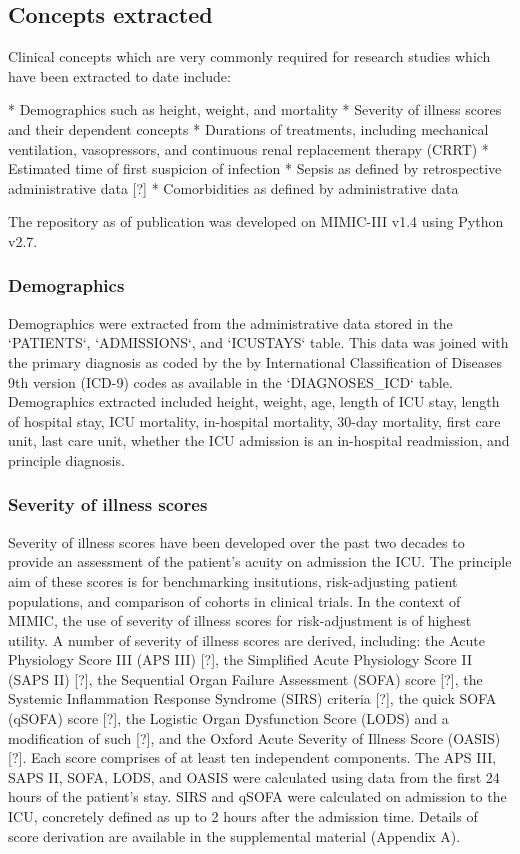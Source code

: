 \documentclass{elsart}
\begin{document}
\subsection{Concepts extracted}

Clinical concepts which are very commonly required for research studies which have been extracted to date include:

* Demographics such as height, weight, and mortality
* Severity of illness scores and their dependent concepts
* Durations of treatments, including mechanical ventilation, vasopressors, and continuous renal replacement therapy (CRRT)
* Estimated time of first suspicion of infection
* Sepsis as defined by retrospective administrative data [?]
* Comorbidities as defined by administrative data

The repository as of publication was developed on MIMIC-III v1.4 using Python v2.7.

\subsubsection{Demographics}

Demographics were extracted from the administrative data stored in the `PATIENTS`, `ADMISSIONS`, and `ICUSTAYS` table. This data was joined with the primary diagnosis as coded by the by International Classification of Diseases 9th version (ICD-9) codes as available in the `DIAGNOSES_ICD` table.
Demographics extracted included height, weight, age, length of ICU stay, length of hospital stay, ICU mortality, in-hospital mortality, 30-day mortality, first care unit, last care unit, whether the ICU admission is an in-hospital readmission, and principle diagnosis.

\subsubsection{Severity of illness scores}

Severity of illness scores have been developed over the past two decades to provide an assessment of the patient's acuity on admission the ICU. The principle aim of these scores is for benchmarking insitutions, risk-adjusting patient populations, and comparison of cohorts in clinical trials. In the context of MIMIC, the use of severity of illness scores for risk-adjustment is of highest utility. A number of severity of illness scores are derived, including: the Acute Physiology Score III (APS III) [?], the Simplified Acute Physiology Score II (SAPS II) [?], the Sequential Organ Failure Assessment (SOFA) score [?], the Systemic Inflammation Response Syndrome (SIRS) criteria [?], the quick SOFA (qSOFA) score [?], the Logistic Organ Dysfunction Score (LODS) and a modification of such [?], and the Oxford Acute Severity of Illness Score (OASIS) [?]. Each score comprises of at least ten independent components. The APS III, SAPS II, SOFA, LODS, and OASIS were calculated using data from the first 24 hours of the patient's stay. SIRS and qSOFA were calculated on admission to the ICU, concretely defined as up to 2 hours after the admission time. Details of score derivation are available in the supplemental material (Appendix A).
\end{document}
